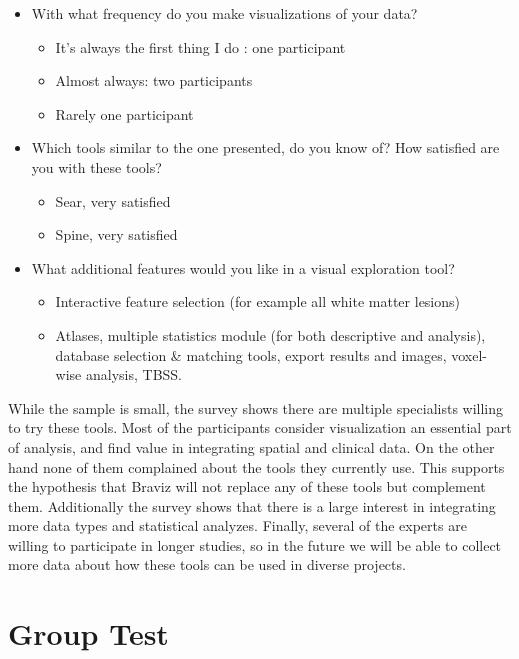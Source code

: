 \begin{itemize}
	\item With what frequency do you make visualizations of your data?
	\begin{itemize}
		\item It's always the first thing I do : one participant
		\item Almost always: two participants
		\item Rarely one participant
	\end{itemize}
	\item Which tools similar to the one presented, do you know of? How satisfied are you with these tools?
	\begin{itemize}
		\item Sear, very satisfied
		\item Spine, very satisfied
	\end{itemize}
	\item What additional features would you  like in a visual exploration tool?
	\begin{itemize}
		\item Interactive feature selection (for example all white matter lesions)
		\item Atlases, multiple statistics module (for both descriptive and analysis), database selection \& matching tools, export results and images, voxel-wise analysis, TBSS.
	\end{itemize}	
\end{itemize}

\smallskip

While the sample is small, the survey shows there are multiple specialists willing to try these tools. Most of the participants consider visualization an essential part of analysis, and find value in integrating spatial and clinical data. On the other hand none of them complained about the tools they currently use. This supports the hypothesis that Braviz will not replace any of these tools but complement them. Additionally the survey shows that there is a large interest in integrating more data types and statistical analyzes. Finally, several of the experts are willing to participate in longer studies, so in the future we will be able to collect more data about how these tools can be used in diverse projects.


\section{Group Test}

